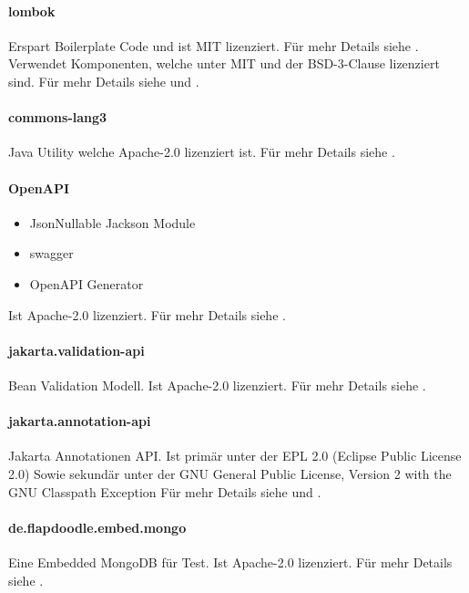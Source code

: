 \paragraph{lombok}
Erspart Boilerplate Code und ist MIT lizenziert.
Für mehr Details siehe .\\
Verwendet Komponenten, welche unter MIT und der BSD-3-Clause lizenziert sind.
Für mehr Details siehe  und .

\paragraph{commons-lang3}
Java Utility welche Apache-2.0 lizenziert ist.
Für mehr Details siehe .

\paragraph{OpenAPI}
\begin{itemize}
    \item JsonNullable Jackson Module
    \item swagger
    \item OpenAPI Generator
\end{itemize}
Ist Apache-2.0 lizenziert.
Für mehr Details siehe .

\paragraph{jakarta.validation-api}
Bean Validation Modell.
Ist Apache-2.0 lizenziert.
Für mehr Details siehe .

\paragraph{jakarta.annotation-api}
Jakarta Annotationen \ac{API}.
Ist primär unter der EPL 2.0 (Eclipse Public License 2.0)
Sowie sekundär unter der GNU General Public License, Version 2 with the GNU Classpath Exception
Für mehr Details siehe  und .

\paragraph{de.flapdoodle.embed.mongo}
Eine Embedded MongoDB für Test.
Ist Apache-2.0 lizenziert.
Für mehr Details siehe .

